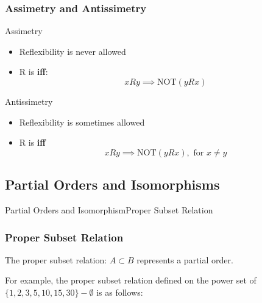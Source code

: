 \begin{frame}
  \frametitle{Assimetry and Antissimetry}

  {\larger

    \begin{block}{Assimetry}
      \begin{itemize}
      \item Reflexibility is \alert{never} allowed
      \item R is  {\bf iff}:
        \begin{equation*}
          xRy \implies \text{NOT}(yRx)
        \end{equation*}
      \end{itemize}

    \end{block}

    \begin{block}{Antissimetry}
      \begin{itemize}
      \item Reflexibility is \alert{sometimes} allowed
      \item R is  {\bf iff}
        \begin{equation*}
          xRy \implies \text{NOT}(yRx), \text{ for } x \neq y
        \end{equation*}
      \end{itemize}
    \end{block}
  }
\end{frame}


\subsection{Partial Orders and Isomorphisms}

\begin{frame}{Partial Orders and Isomorphism}{Proper Subset Relation}
  \frametitle{Proper Subset Relation}

  The proper subset relation: $A \subset B$ represents a partial order.\bigskip

  For example, the proper subset relation defined on the power set of $\{1,2,3,5,10,15,30\} - \emptyset$ is as follows:

\begin{center}
  \end{center}
\end{frame}

